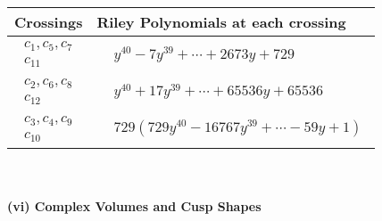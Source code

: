 \documentclass[1p]{elsarticle_modified}
\theoremstyle{definition}
\begin{document}
\begin{tabular}{m{50pt}|m{274pt}}
Crossings & \hspace{64pt}Riley Polynomials at each crossing \\
\hline $$\begin{aligned}c_{1},c_{5},c_{7}\\c_{11}\end{aligned}$$&$\begin{aligned}
&y^{40}-7 y^{39}+\cdots+2673 y+729
\end{aligned}$\\
\hline $$\begin{aligned}c_{2},c_{6},c_{8}\\c_{12}\end{aligned}$$&$\begin{aligned}
&y^{40}+17 y^{39}+\cdots+65536 y+65536
\end{aligned}$\\
\hline $$\begin{aligned}c_{3},c_{4},c_{9}\\c_{10}\end{aligned}$$&$\begin{aligned}
&729(729 y^{40}-16767 y^{39}+\cdots-59 y+1)
\end{aligned}$\\
\hline
\end{tabular}\\~\\
\newpage\flushleft \textbf{(vi) Complex Volumes and Cusp Shapes}
\end{document}
